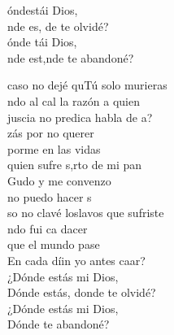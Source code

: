\begin{cancion}%
	\begin{chorus}%
	óndestái Dios, \\
	nde es, de te olvidé?  \\
	ónde tái Dios, \\
	nde est,nde te abandoné?  \\
	\end{chorus}%
	caso no dejé quTú solo murieras\\
	ndo al cal la razón a quien\\
	juscia no predica habla de a?\\
	zás por no querer \\
	porme en las vidas\\
	quien sufre s,rto de mi pan\\
	Gudo y me convenzo \\
	 no puedo hacer s\\
	so no clavé loslavos que sufriste\\
	ndo fui ca dacer \\
que el mundo pase\\
	En  cada díin yo antes caar? \\
¿Dónde estás mi Dios,\\
Dónde estás, donde te olvidé?\\
¿Dónde estás mi Dios,\\
Dónde te abandoné?\\
\end{cancion}%
